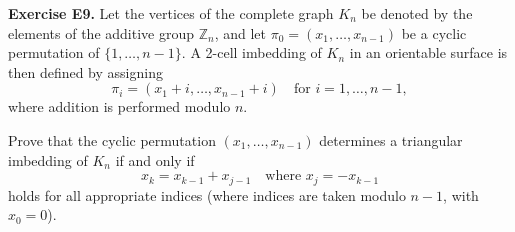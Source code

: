 \textbf{Exercise E9.}
Let the vertices of the complete graph $K_n$ be denoted by the elements of the additive group $\mathbb{Z}_n$, and let $\pi_0 = (x_1, \ldots, x_{n-1})$ be a cyclic permutation of $\{1, \ldots, n-1\}$. A 2-cell imbedding of $K_n$ in an orientable surface is then defined by assigning
$$\pi_i = (x_1 + i, \ldots, x_{n-1} + i) \quad \text{for } i = 1, \ldots, n-1,$$
where addition is performed modulo $n$.

Prove that the cyclic permutation $(x_1, \ldots, x_{n-1})$ determines a triangular imbedding of $K_n$ if and only if
$$x_k = x_{k-1} + x_{j-1} \quad \text{where } x_j = -x_{k-1}$$
holds for all appropriate indices (where indices are taken modulo $n-1$, with $x_0 = 0$).
